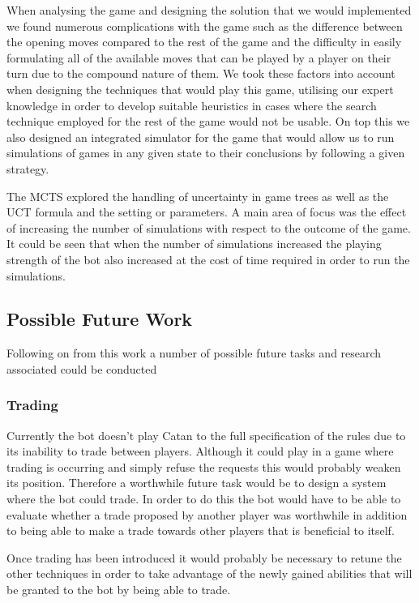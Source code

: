 \documentclass[]{article}
\begin{document}
When analysing the game and designing the solution that we would implemented we found numerous complications with the game such as the difference between the opening moves compared to the rest of the game and the difficulty in easily formulating all of the available moves that can be played by a player on their turn due to the compound nature of them. We took these factors into account when designing the techniques that would play this game, utilising our expert knowledge in order to develop suitable heuristics in cases where the search technique employed for the rest of the game would not be usable. On top this we also designed an integrated simulator for the game that would allow us to run simulations of games in any given state to their conclusions by following a given strategy.

The MCTS explored the handling of uncertainty in game trees as well as the UCT formula and the setting or parameters. A main area of focus was the effect of increasing the number of simulations with respect to the outcome of the game. It could be seen that when the number of simulations increased the playing strength of the bot also increased at the cost of time required in order to run the simulations.

\subsection{Possible Future Work}
Following on from this work a number of possible future tasks and research associated could be conducted
\subsubsection{Trading}
Currently the bot doesn't play Catan to the full specification of the rules due to its inability to trade between players. Although it could play in a game where trading is occurring and simply refuse the requests this would probably weaken its position. Therefore a worthwhile future task would be to design a system where the bot could trade. In order to do this the bot would have to be able to evaluate whether a trade proposed by another player was worthwhile in addition to being able to make a trade towards other players that is beneficial to itself.

Once trading has been introduced it would probably be necessary to retune the other techniques in order to take advantage of the newly gained abilities that will be granted to the bot by being able to trade.
\end{document}
